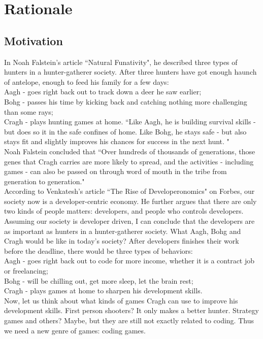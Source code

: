 \documentclass[12pt]{article}
\begin{document}
\section{Rationale}

\subsection{Motivation}
In Noah Falstein's article ``Natural Funativity"\cite{noah2004}, he described three types of hunters in a hunter-gatherer society. After three hunters have got enough haunch of antelope, enough to feed his family for a few days:\\
Aagh - goes right back out to track down a deer he saw earlier;\\
Bohg - passes his time by kicking back and catching nothing more challenging than some rays;\\
Cragh - plays hunting games at home. ``Like Aagh, he is building survival skills - but does so it in the safe confines of home. Like Bohg, he stays safe - but also stays fit and slightly improves his chances for success in the next hunt. "\\

Noah Falstein concluded that ``Over hundreds of thousands of generations, those genes that Cragh carries are more likely to spread, and the activities - including games - can also be passed on through word of mouth in the tribe from generation to generation."\\

According to Venkatesh's article ``The Rise of Developeronomics"\cite{venkatesh2011} on Forbes, our society now is a developer-centric economy. He further argues that there are only two kinds of people matters: developers, and people who controls developers. Assuming our society is developer driven, I can conclude that the developers are as important as hunters in a hunter-gatherer society. What Aagh, Bohg and Cragh would be like in today's society? After developers finishes their work before the deadline, there would be three types of behaviors:\\
Aagh - goes right back out to code for more income, whether it is a contract job or freelancing;\\
Bohg - will be chilling out, get more sleep, let the brain rest;\\
Cragh - plays games at home to sharpen his development skills.\\ 

Now, let us think about what kinds of games Cragh can use to improve his development skills. First person shooters? It only makes a better hunter. Strategy games and others? Maybe, but they are still not exactly related to coding. Thus we need a new genre of games: coding games.\\
\end{document}
